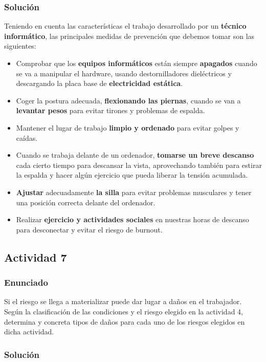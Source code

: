 \subsubsection{Solución}
Teniendo en cuenta las características el trabajo desarrollado por un \textbf{técnico informático}, las principales medidas de prevención que debemos tomar son las siguientes:

\begin{itemize}
    \item Comprobar que los \textbf{equipos informáticos} están siempre \textbf{apagados} cuando se va a manipular el hardware, usando destornilladores dieléctricos y descargando la placa base de \textbf{electricidad estática}.
    \item Coger la postura adecuada, \textbf{flexionando las piernas}, cuando se van a \textbf{levantar pesos} para evitar tirones y problemas de espalda.
    \item Mantener el lugar de trabajo \textbf{limpio y ordenado} para evitar golpes  y caídas.
    \item Cuando se trabaja delante de un ordenador, \textbf{tomarse un breve descanso} cada cierto tiempo para descansar la vista, aprovechando también para estirar la espalda y hacer algún ejercicio que pueda liberar la tensión acumulada.
    \item \textbf{Ajustar} adecuadamente \textbf{la silla} para evitar problemas musculares y tener una posición correcta delante del ordenador.
    \item Realizar \textbf{ejercicio y actividades sociales} en nuestras horas de descanso para desconectar y evitar el riesgo de burnout.
\end{itemize}

\subsection{Actividad 7}

\subsubsection{Enunciado}
Si el riesgo se llega a materializar puede dar lugar a daños en el trabajador. Según la clasificación de las condiciones y el riesgo elegido en la actividad 4, determina y concreta tipos de daños  para cada uno de los riesgos elegidos en dicha actividad.

\subsubsection{Solución}


